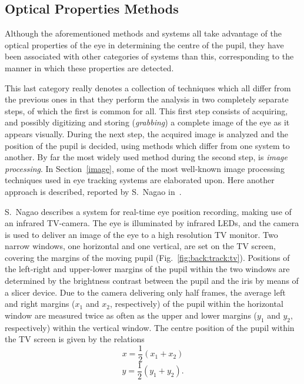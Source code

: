 \subsection{Optical Properties Methods}
\label{back:track:tv}

Although the aforementioned methods and systems all take advantage of
the optical properties of the eye in determining the centre of the
pupil, they have been associated with other categories of systems than
this, corresponding to the manner in which these properties are
detected.

This last category really denotes a collection of techniques which all
differ from the previous ones in that they perform the analysis in two
completely separate steps, of which the first is common for all.  This
first step consists of acquiring, and possibly digitizing and storing
({\em grabbing\/}) a complete image of the eye as it appears visually.
During the next step, the acquired image is analyzed and the position
of the pupil is decided, using methods which differ from one system to
another.  By far the most widely used method during the second step,
is {\em image processing\/}.  In Section~\ref{image}, some of the
most well-known image processing techniques used in eye tracking
systems are elaborated upon.  Here another approach is described,
reported by S.\ Nagao in~\cite{tv}.

S.\ Nagao describes a system for real-time eye position recording,
making use of an infrared TV-camera.  The eye is illuminated by
infrared LEDs, and the camera is used to deliver an image of the eye
to a high resolution TV monitor.  Two narrow windows, one horizontal
and one vertical, are set on the TV screen, covering the margins of
the moving pupil (Fig.~\ref{fig:back:track:tv}).  Positions of the
left-right and upper-lower margins of the pupil within the two windows
are determined by the brightness contrast between the pupil and the
iris by means of a slicer device.  Due to the camera delivering only
half frames, the average left and right margins ($x_{1}$ and $x_{2}$,
respectively) of the pupil within the horizontal window are measured
twice as often as the upper and lower margins ($y_{1}$ and $y_{2}$,
respectively) within the vertical window.  The centre position of the
pupil within the TV screen is given by the relations
\[x=\frac{1}{2}(x_{1}+x_{2})\] \[y=\frac{1}{2}(y_{1}+y_{2})\mbox{.}\]


